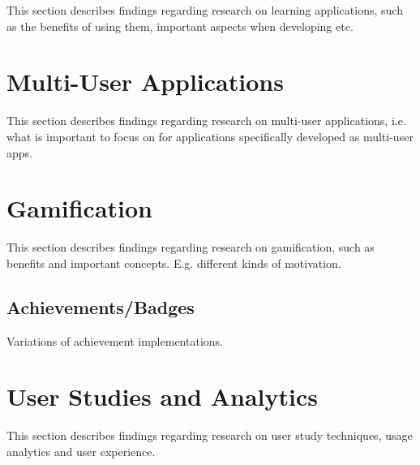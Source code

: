This section describes findings regarding research on learning applications, such as the benefits of using them, important aspects when developing etc.


\section{Multi-User Applications}

This section describes findings regarding research on multi-user applications, i.e. what is important to focus on for applications specifically developed as multi-user apps.


\section{Gamification}

This section describes findings regarding research on gamification, such as benefits and important concepts. E.g. different kinds of motivation.

\subsection{Achievements/Badges}

Variations of achievement implementations.


\section{User Studies and Analytics}

This section describes findings regarding research on user study techniques, usage analytics and user experience.